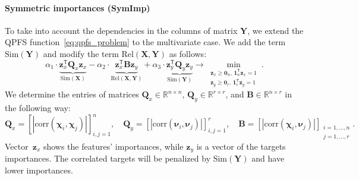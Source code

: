 \documentclass[preprint,authoryear,12pt]{elsarticle}
\theoremstyle{definition}
\newcommand{\bz}{\mathbf{z}}
\newcommand{\bY}{\mathbf{Y}}
\newcommand{\bX}{\mathbf{X}}
\newcommand{\bB}{\mathbf{B}}
\newcommand{\bQ}{\mathbf{Q}}
\newcommand{\bbR}{\mathbb{R}}
\newcommand{\T}{\mathsf{T}}
\newcommand{\bchi}{\boldsymbol{\chi}}
\newcommand{\bnu}{\boldsymbol{\nu}}
\newcommand{\bOne}{\boldsymbol{1}}
\newcommand{\bZero}{\boldsymbol{0}}
\begin{document}
\paragraph{Symmetric importances (SymImp)}

To take into account the dependencies in the columns of matrix $\bY$, we extend the QPFS function~\eqref{eq:qpfs_problem} to the multivariate case.
We add the term~$\text{Sim}(\bY)$ and modify the term $\text{Rel}(\bX, \bY)$ as follows:
\begin{equation}
\alpha_1 \cdot \underbrace{\bz_x^{\T} \bQ_x \bz_x}_{\text{Sim}(\bX)} - \alpha_2 \cdot \underbrace{\bz_x^{\T} \bB \bz_y}_{\text{Rel}(\bX, \bY)} + \alpha_3 \cdot \underbrace{\bz_y^{\T} \bQ_y \bz_y}_{\text{Sim}(\bY)} \rightarrow \min_{\substack{\bz_x \geq \bZero_n, \, \bOne_n^{\T}\bz_x=1 \\ \bz_y \geq \bZero_r, \, \bOne_r^{\T}\bz_y=1}}.
\label{eq:symimp}
\end{equation}
We determine the entries of matrices $\bQ_x \in \bbR^{n \times n}$, $\bQ_y \in \bbR^{r \times r}$, and $\bB \in \bbR^{n \times r}$ in the following way:
\begin{equation*}
\bQ_x = \left[ |\text{corr}(\bchi_i, \bchi_j)| \right]_{i,j=1}^n, \quad
\bQ_y = \left[ |\text{corr}(\bnu_i, \bnu_j)| \right]_{i,j=1}^r, \quad
\bB =  \left[ |\text{corr}(\bchi_i, \bnu_j)| \right]_{\substack{i=1, \dots, n \\ j=1, \dots, r}}.
\end{equation*}
Vector~$\bz_x$ shows the features' importances, while $\bz_y$ is a vector of the targets importances.
The correlated targets will be penalized by $\text{Sim} (\bY)$ and have lower importances.
\end{document}
